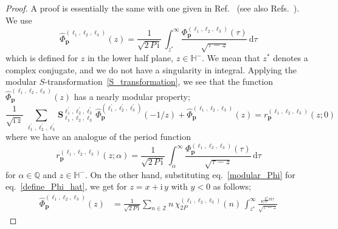 \documentclass[12pt,reqno]{amsart}
\numberwithin{equation}{section}
\begin{document}
\begin{proof}
  A proof is essentially the same with one given in Ref.~
  (see also Refs.~).
  We use
  \begin{equation}
    \label{define_Phi_hat}
    \widehat{\Phi}_{\boldsymbol{p}}^{(\ell_1,\ell_2,\ell_3)}(z)
    =
    \frac{1}{\sqrt{2 \, P \, \mathrm{i}}} \,
    \int_{z^*}^\infty
    \frac{
      \Phi_{\boldsymbol{p}}^{(\ell_1,\ell_2,\ell_3)}(\tau)
    }{
      \sqrt{\tau - z}
    }
    \,
    \mathrm{d} \tau
  \end{equation}
  which is defined for $z$ in the lower half plane,
  $z \in \mathbb{H}^-$.
  We mean that  $z^*$ denotes a  complex conjugate,
  and we do not have a singularity in integral.
  Applying the modular ${S}$-transformation~\eqref{S_transformation},
  we see that the function
  $    \widehat{\Phi}_{\boldsymbol{p}}^{(\ell_1,\ell_2,\ell_3)}(z)$
  has a nearly modular property;
  \begin{equation}
    \label{modular_Phi_hat}
    \frac{1}{\sqrt{\mathrm{i} \, z}} \,
    \sum_{\ell_1^\prime, \ell_2^\prime, \ell_3^\prime}
    \mathbf{S}_{\ell_1, \ell_2, \ell_3}^{\ell_1^\prime, \ell_2^\prime,
      \ell_3^\prime} \,
    \widehat{\Phi}_{\boldsymbol{p}}^{(\ell_1^\prime, \ell_2^\prime,
      \ell_3^\prime)}(-1/z)
    +
    \widehat{\Phi}_{\boldsymbol{p}}^{(\ell_1, \ell_2 , \ell_3)}(z)
    =
    r_{\boldsymbol{p}}^{(\ell_1, \ell_2 , \ell_3)}(z;0)
  \end{equation}
  where we have an analogue of the
  period function
  \begin{equation}
    \label{define_r_function}
    r_{\boldsymbol{p}}^{(\ell_1, \ell_2, \ell_3)}(z ; \alpha)
    =
    \frac{1}{
      \sqrt{2 \, P \, \mathrm{i}}
    } \,
    \int_\alpha^\infty
    \frac{\Phi_{\boldsymbol{p}}^{(\ell_1, \ell_2, \ell_3)}(\tau)}{
      \sqrt{\tau-z}
    } \,
    \mathrm{d} \tau
  \end{equation}
  for $\alpha \in \mathbb{Q}$ and $z\in \mathbb{H}^-$.
  On the other hand,  substituting eq.~\eqref{modular_Phi} for eq.~\eqref{define_Phi_hat},
  we get for $z= x + \mathrm{i} \, y$ with $y < 0$
  as follows;
  \begin{align*}
    \widehat{\Phi}_{\boldsymbol{p}}^{(\ell_1 , \ell_2, \ell_3)}(z)
    & =
    \frac{1}{\sqrt{2 \, P \, \mathrm{i}}}
    \sum_{n \in \mathbb{Z}}
    n \,
    \chi_{2 P}^{(\ell_1 , \ell_2 ,\ell_3)}(n) \,
    \int_{z^*}^\infty
    \frac{
      \mathrm{e}^{\frac{n^2}{2 P} \pi \mathrm{i} \tau}
    }{
      \sqrt{\tau - z}
}
\end{align*}
\end{proof}
\end{document}
